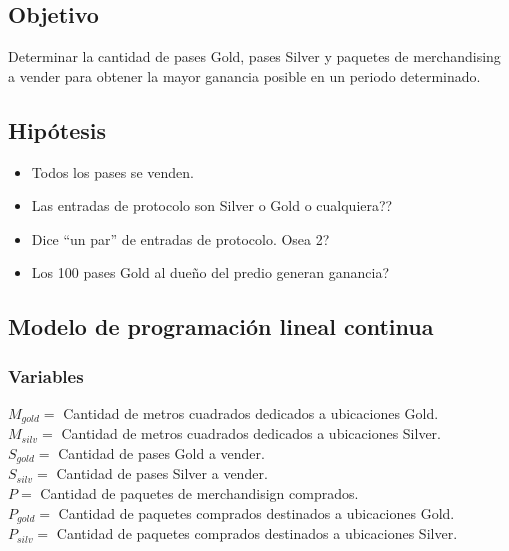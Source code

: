 \documentclass[a4paper]{article}
\begin{document}
\subsection{Objetivo}
Determinar la cantidad de pases Gold, pases Silver y paquetes de merchandising a vender para obtener la mayor ganancia posible en un periodo determinado.

\subsection{Hipótesis}

\begin{itemize}
    \item Todos los pases se venden.
    \item Las entradas de protocolo son Silver o Gold o cualquiera??
    \item Dice ``un par'' de entradas de protocolo. Osea 2?
    \item Los 100 pases Gold al dueño del predio generan ganancia?

\end{itemize}


\subsection{Modelo de programación lineal continua}
\subsubsection{Variables}

$M_{gold} =$ Cantidad de metros cuadrados dedicados a ubicaciones Gold.\\

$M_{silv} =$ Cantidad de metros cuadrados dedicados a ubicaciones Silver.\\

$S_{gold} =$ Cantidad de pases Gold a vender.\\

$S_{silv} =$ Cantidad de pases Silver a vender.\\

$P =$ Cantidad de paquetes de merchandisign comprados.\\

$P_{gold} =$ Cantidad de paquetes comprados destinados a ubicaciones Gold.\\

$P_{silv} =$ Cantidad de paquetes comprados destinados a ubicaciones Silver.\\
\end{document}
